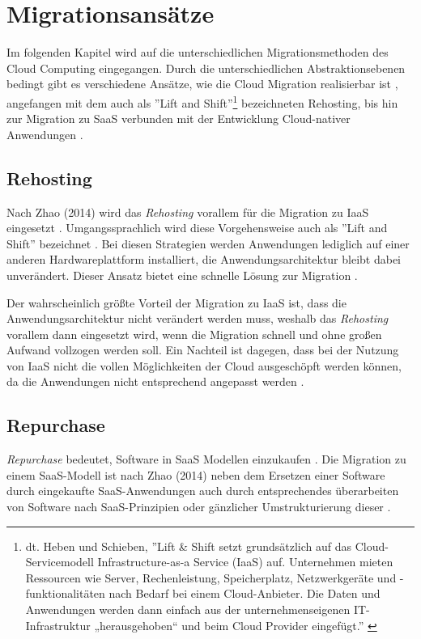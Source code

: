 \section{Migrationsansätze}
\label{sec:migrationsansaetze}

Im folgenden Kapitel wird auf die unterschiedlichen Migrationsmethoden des Cloud Computing eingegangen. Durch die unterschiedlichen Abstraktionsebenen bedingt gibt es verschiedene Ansätze, wie die Cloud Migration realisierbar ist \cite[Vgl.][S. 226]{Surianarayanan2019}, angefangen mit dem auch als ''Lift and Shift''\footnote{dt. Heben und Schieben, ''Lift \& Shift setzt grundsätzlich auf das Cloud-Servicemodell Infrastructure-as-a Service (IaaS) auf. Unternehmen mieten Ressourcen wie Server, Rechenleistung, Speicherplatz, Netzwerkgeräte und -funktionalitäten nach Bedarf bei einem Cloud-Anbieter. Die Daten und Anwendungen werden dann einfach aus der unternehmenseigenen IT-Infrastruktur „herausgehoben“ und beim Cloud Provider eingefügt.'' \cite[][]{Howen2020}} bezeichneten Rehosting, bis hin zur Migration zu \ac{SaaS} verbunden mit der Entwicklung Cloud-nativer Anwendungen \cite[Vgl.][S. 144]{Zhao2014}.

\subsection{Rehosting}
Nach Zhao (2014) wird das \textit{Rehosting} vorallem für die Migration zu \ac{IaaS} eingesetzt \cite[Vgl.][S. 144]{Zhao2014}. Umgangssprachlich wird diese Vorgehensweise auch als ''Lift and Shift'' bezeichnet \cite[Vgl.][]{NetApp}. Bei diesen Strategien werden Anwendungen lediglich auf einer anderen Hardwareplattform installiert, die Anwendungsarchitektur bleibt dabei unverändert. Dieser Ansatz bietet eine schnelle Lösung zur Migration \cite[Vgl.][]{CIO}.


Der wahrscheinlich größte Vorteil der Migration zu \ac{IaaS} ist, dass die Anwendungsarchitektur nicht verändert werden muss, weshalb das \textit{Rehosting} vorallem dann eingesetzt wird, wenn die Migration schnell und ohne großen Aufwand vollzogen werden soll. Ein Nachteil ist dagegen, dass bei der Nutzung von \ac{IaaS} nicht die vollen Möglichkeiten der Cloud ausgeschöpft werden können, da die Anwendungen nicht entsprechend angepasst werden \cite[Vgl.][]{CIO}.

\subsection{Repurchase}
\textit{Repurchase} bedeutet, Software in \ac{SaaS} Modellen einzukaufen \cite[Vgl.][S. 2]{Ahmad2018}. Die Migration zu einem \ac{SaaS}-Modell ist nach Zhao (2014) neben dem Ersetzen einer Software durch eingekaufte \ac{SaaS}-Anwendungen auch durch entsprechendes überarbeiten von Software nach \ac{SaaS}-Prinzipien oder gänzlicher Umstrukturierung dieser \cite[Vgl.][S. 144]{Zhao2014}. 

